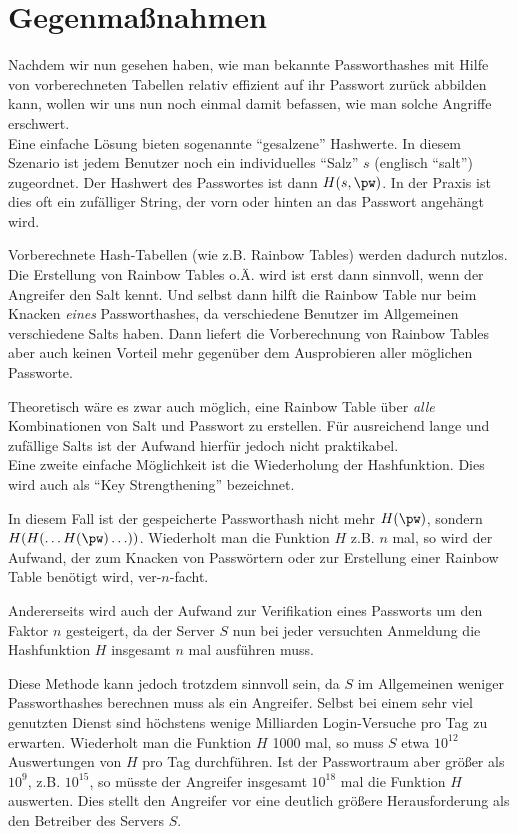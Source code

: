 \section{Gegenmaßnahmen}

Nachdem wir nun gesehen haben, wie man bekannte Passworthashes mit Hilfe von vorberechneten Tabellen relativ effizient auf ihr Passwort zurück abbilden kann, wollen wir uns nun noch einmal damit befassen, wie man solche Angriffe erschwert.\\

Eine einfache Lösung bieten sogenannte "`gesalzene"' Hashwerte. In diesem Szenario ist jedem Benutzer noch ein individuelles "`Salz"' $s$ (englisch "`salt"') zugeordnet. Der Hashwert des Passwortes ist dann $H(s, \pw)$. In der Praxis ist dies oft ein zufälliger String, der vorn oder hinten an das Passwort angehängt wird.

Vorberechnete Hash-Tabellen (wie z.B. Rainbow Tables) werden dadurch nutzlos. Die Erstellung von Rainbow Tables o.Ä. wird ist erst dann sinnvoll, wenn der Angreifer den Salt kennt. Und selbst dann hilft die Rainbow Table nur beim Knacken \emph{eines} Passworthashes, da verschiedene Benutzer im Allgemeinen verschiedene Salts haben. Dann liefert die Vorberechnung von Rainbow Tables aber auch keinen Vorteil mehr gegenüber dem Ausprobieren aller möglichen Passworte.

Theoretisch wäre es zwar auch möglich, eine Rainbow Table über \emph{alle} Kombinationen von Salt und Passwort zu erstellen. Für ausreichend lange und zufällige Salts ist der Aufwand hierfür jedoch nicht praktikabel.\\

Eine zweite einfache Möglichkeit ist die Wiederholung der Hashfunktion. Dies wird auch als "`Key Strengthening"' bezeichnet.

In diesem Fall ist der gespeicherte Passworthash nicht mehr $H(\pw)$, sondern $H(H(\ldots H(\pw)\ldots))$. Wiederholt man die Funktion $H$ z.B. $n$ mal, so wird der Aufwand, der zum Knacken von Passwörtern oder zur Erstellung einer Rainbow Table benötigt wird, ver-$n$-facht.

Andererseits wird auch der Aufwand zur Verifikation eines Passworts um den Faktor $n$ gesteigert, da der Server $S$ nun bei jeder versuchten Anmeldung die Hashfunktion $H$ insgesamt $n$ mal ausführen muss.

Diese Methode kann jedoch trotzdem sinnvoll sein, da $S$ im Allgemeinen weniger Passworthashes berechnen muss als ein Angreifer. Selbst bei einem sehr viel genutzten Dienst sind höchstens wenige Milliarden Login-Versuche pro Tag zu erwarten. Wiederholt man die Funktion $H$ 1000 mal, so muss $S$ etwa $10^{12}$ Auswertungen von $H$ pro Tag durchführen. Ist der Passwortraum aber größer als $10^9$, z.B. $10^{15}$, so müsste der Angreifer insgesamt $10^{18}$ mal die Funktion $H$ auswerten. Dies stellt den Angreifer vor eine deutlich größere Herausforderung als den Betreiber des Servers $S$.

